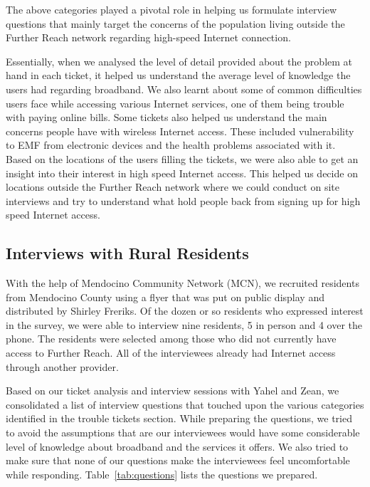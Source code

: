 The above categories played a pivotal role in helping us formulate interview questions that mainly target the concerns of the population living outside the Further Reach network regarding high-speed Internet connection.

Essentially, when we analysed the level of detail provided about the problem
at hand in each ticket, it helped us understand the average level of knowledge
the users had regarding broadband. We also learnt about some of common
difficulties users face while accessing various Internet services, one of them
being trouble with paying online bills. Some tickets also helped us understand
the main concerns people have with wireless Internet access. These included
vulnerability to EMF from electronic devices and the health problems
associated with it. Based on the locations of the users filling the tickets,
we were also able to get an insight into their interest in high speed Internet
access. This helped us decide on locations outside the Further Reach network
where we could conduct on site interviews and try to understand what hold
people back from signing up for high speed Internet access.

\subsection{Interviews with Rural Residents}
\label{sec:interv-with-rural}

With the help of Mendocino Community Network (MCN), we recruited
residents from Mendocino County using a flyer that was put on public display
and distributed by Shirley Freriks.
Of the dozen or so residents who expressed interest in the survey, we were able to interview
nine residents, 5 in person and 4 over the phone. The residents were selected among those
who did not currently have access to Further Reach. All of the interviewees
already had Internet access through another provider.

Based on our ticket analysis and interview sessions with Yahel and Zean, we consolidated a list of interview
questions that touched upon the various categories identified in the trouble tickets section. While preparing
the questions, we tried to avoid the assumptions that are our interviewees would have some considerable level
of knowledge about broadband and the services it offers. We also tried to make sure that none of our questions
make the interviewees feel uncomfortable while responding. Table~\ref{tab:questions} lists the questions
we prepared.

